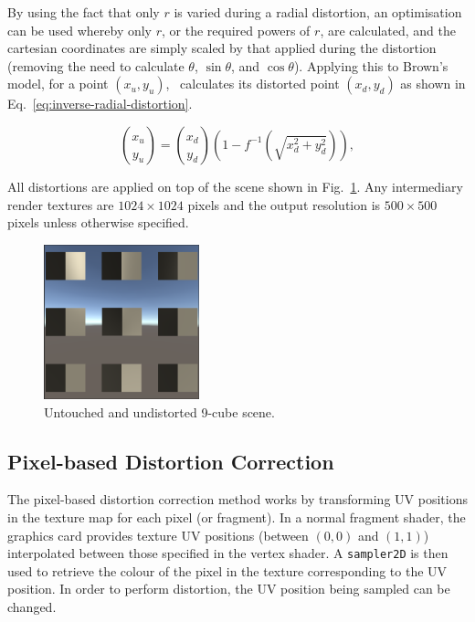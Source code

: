 By using the fact that only $r$ is varied during a radial distortion, an optimisation can be used whereby only $r$, or the required powers of $r$, are calculated, and the cartesian coordinates are simply scaled by that applied during the distortion (removing the need to calculate $\theta$, $\sin{\theta}$, and $\cos{\theta}$).
Applying this to Brown's model, for a point $(x_u, y_u)$,~\cite{mallon2004precise} calculates its distorted point $(x_d, y_d)$ as shown in Eq.~\ref{eq:inverse-radial-distortion}.

\begin{equation}
    \label{eq:inverse-radial-distortion}
    \binom{x_u}{y_u} = \binom{x_d}{y_d} \left(1 - f^{-1}\left(\sqrt{x_d^2 + y_d^2}\right)\right),
\end{equation}

All distortions are applied on top of the scene shown in Fig.~\ref{fig:no-distortion}.
Any intermediary render textures are $1024 \times 1024$ pixels and the output resolution is $500 \times 500$ pixels unless otherwise specified.

\begin{figure}[ht]
    \centering
    \includegraphics[width=0.4\textwidth]{figures/no-distortion}
    \caption{Untouched and undistorted 9-cube scene.}
    \label{fig:no-distortion}
\end{figure}

\subsection{Pixel-based Distortion Correction}\label{sec:pixel-based}

The pixel-based distortion correction method works by transforming UV positions in the texture map for each pixel (or fragment).
In a normal fragment shader, the graphics card provides texture UV positions (between $(0, 0)$ and $(1, 1)$) interpolated between those specified in the vertex shader.
A \texttt{sampler2D} is then used to retrieve the colour of the pixel in the texture corresponding to the UV position.
In order to perform distortion, the UV position being sampled can be changed.

